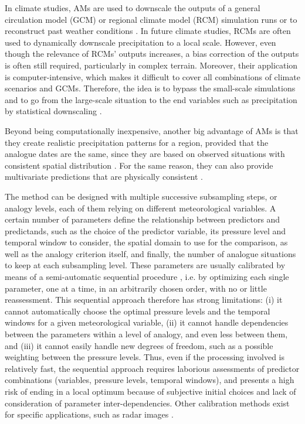 \documentclass[review]{elsarticle}
\begin{document}
In climate studies, AMs are used to downscale the outputs of a general circulation model (GCM) or regional climate model (RCM) simulation runs \citep{Dayon2015} or to reconstruct past weather conditions \citep{Caillouet2016}. In future climate studies, RCMs are often used to dynamically downscale precipitation to a local scale. However, even though the relevance of RCMs' outputs increases, a bias correction of the outputs is often still required, particularly in complex terrain. Moreover, their application is computer-intensive, which makes it difficult to cover all combinations of climate scenarios and GCMs. Therefore, the idea is to bypass the small-scale simulations and to go from the large-scale situation to the end variables such as precipitation by statistical downscaling \citep{Maraun2010}. 

Beyond being computationally inexpensive, another big advantage of AMs is that they create realistic precipitation patterns for a region, provided that the analogue dates are the same, since they are based on observed situations with consistent spatial distribution \citep{Radanovics2013, Chardon2014}. For the same reason, they can also provide multivariate predictions that are physically consistent \citep{Raynaud2016b}.

The method can be designed with multiple successive subsampling steps, or analogy levels, each of them relying on different meteorological variables. A certain number of parameters define the relationship between predictors and predictands, such as the choice of the predictor variable, its pressure level and temporal window to consider, the spatial domain to use for the comparison, as well as the analogy criterion itself, and finally, the number of analogue situations to keep at each subsampling level. These parameters are usually calibrated by means of a semi-automatic sequential procedure \citep{Bontron2004, Radanovics2013}, i.e. by optimizing each single parameter, one at a time, in an arbitrarily chosen order, with no or little reassessment. This sequential approach therefore has strong limitations: (i) it cannot automatically choose the optimal pressure levels and the temporal windows for a given meteorological variable, (ii) it cannot handle dependencies between the parameters within a level of analogy, and even less between them, and (iii) it cannot easily handle new degrees of freedom, such as a possible weighting between the pressure levels. Thus, even if the processing involved is relatively fast, the sequential approach requires laborious assessments of predictor combinations (variables, pressure levels, temporal windows), and presents a high risk of ending in a local optimum because of subjective initial choices and lack of consideration of parameter inter-dependencies. Other calibration methods exist for specific applications, such as radar images \citep{Panziera2011, Foresti2015a}.
\end{document}
